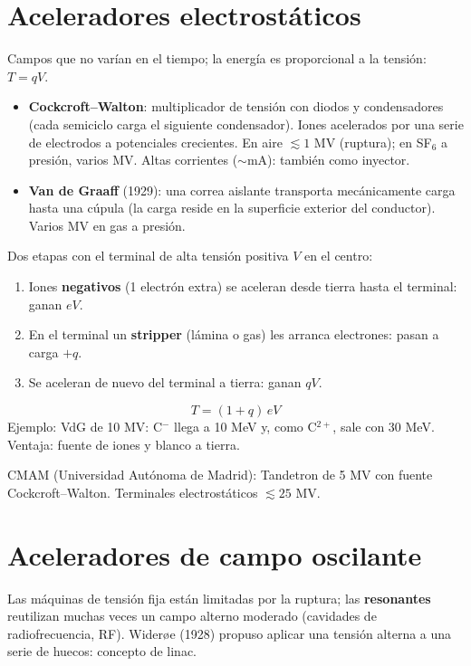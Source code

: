 \section{Aceleradores electrostáticos}
Campos que no varían en el tiempo; la energía es proporcional a la tensión: $T=qV$.
\begin{itemize}
\item \textbf{Cockcroft--Walton}: multiplicador de tensión con diodos y condensadores (cada semiciclo carga el siguiente condensador).
Iones acelerados por una serie de electrodos a potenciales crecientes. En aire $\lesssim1$ MV (ruptura); en SF$_6$ a presión, varios MV.
Altas corrientes ($\sim$mA): también como inyector.
\item \textbf{Van de Graaff} (1929): una correa aislante transporta mecánicamente carga hasta una cúpula (la carga reside en la superficie
exterior del conductor). Varios MV en gas a presión.
\end{itemize}
\begin{clave}
Dos etapas con el terminal de alta tensión positiva $V$ en el centro:
\begin{enumerate}
\item Iones \textbf{negativos} (1 electrón extra) se aceleran desde tierra hasta el terminal: ganan $eV$.
\item En el terminal un \textbf{stripper} (lámina o gas) les arranca electrones: pasan a carga $+q$.
\item Se aceleran de nuevo del terminal a tierra: ganan $qV$.
\end{enumerate}
\[ T=(1+q)\,eV \]
Ejemplo: VdG de 10 MV: C$^-$ llega a 10 MeV y, como C$^{2+}$, sale con 30 MeV. Ventaja: fuente de iones y blanco a tierra.
\end{clave}
\begin{dato}
CMAM (Universidad Autónoma de Madrid): Tandetron de 5 MV con fuente Cockcroft--Walton. Terminales electrostáticos $\lesssim25$ MV.
\end{dato}

\section{Aceleradores de campo oscilante}
Las máquinas de tensión fija están limitadas por la ruptura; las \textbf{resonantes} reutilizan muchas veces un campo alterno moderado
(cavidades de radiofrecuencia, RF). Widerøe (1928) propuso aplicar una tensión alterna a una serie de huecos: concepto de linac.

